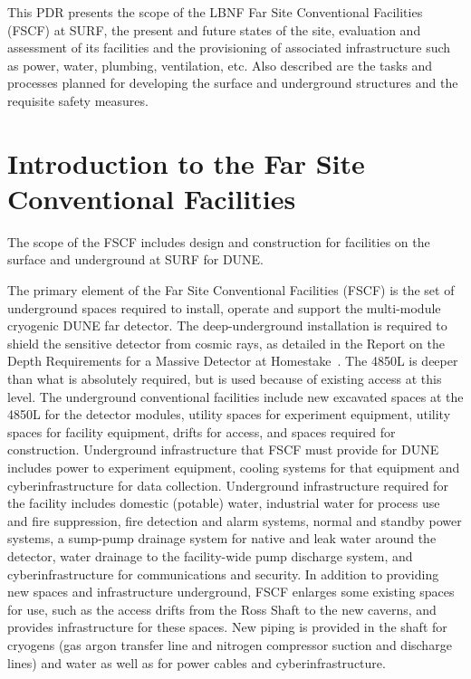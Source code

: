 This PDR presents the scope of the LBNF Far Site Conventional Facilities (FSCF) at SURF, the present and future states of the site, evaluation and assessment of its facilities and the %
provisioning of associated infrastructure such as power, water, plumbing, ventilation, etc. Also described are the  %
tasks and processes planned for developing the surface and underground structures and the requisite safety measures. 


\section{Introduction to the Far Site Conventional Facilities}
\label{sec:fs-facil-cf}

The scope of the FSCF includes design and construction for facilities on the surface and underground at SURF for DUNE. 

The %
primary element of the Far Site Conventional Facilities (FSCF) is the set of underground spaces required to install, operate and support the multi-module cryogenic DUNE far detector. 
The deep-underground installation is required to shield the sensitive detector from cosmic rays, as detailed in the Report on the Depth Requirements for a Massive Detector at Homestake~\cite{depth-doc}. The 4850L is deeper than what is absolutely required, but is used because of existing access at this level. 
%
The underground conventional facilities include new excavated spaces at the 4850L for the detector modules, utility spaces for experiment equipment, utility spaces for facility equipment, drifts for access, and spaces required for construction. Underground infrastructure that FSCF must provide for DUNE includes power to experiment equipment, cooling systems for that equipment and cyberinfrastructure for data collection. Underground infrastructure %
required for the facility includes domestic (potable) water, industrial water for process use and fire suppression, fire detection and alarm systems, normal and standby power systems, a sump-pump drainage system for native and leak water around the detector, water drainage to the facility-wide pump discharge system, and cyberinfrastructure for communications and security. In addition to providing new spaces and infrastructure underground, FSCF enlarges some existing spaces for use, such as the access drifts from the Ross Shaft to the new caverns, and provides infrastructure for these spaces. New piping is provided in the shaft for cryogens (gas argon transfer line and nitrogen compressor suction and discharge lines) and water as well as for power cables and cyberinfrastructure. 

